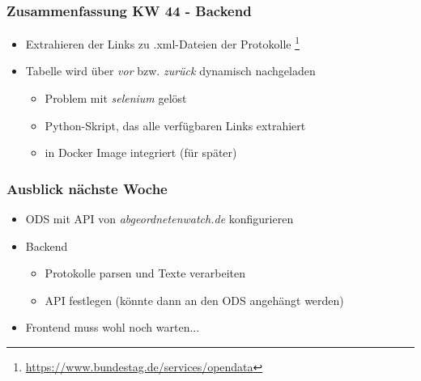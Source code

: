 \documentclass{beamer}
\newcommand{\cw}{44}
\begin{document}
  \begin{frame}
    \frametitle{Zusammenfassung KW \cw{} - Backend}
    \begin{itemize}
      \item Extrahieren der Links zu .xml-Dateien der Protokolle
        \footnote{\url{https://www.bundestag.de/services/opendata}}
      \item Tabelle wird über \textit{vor} bzw. \textit{zurück} dynamisch
        nachgeladen
        \begin{itemize}
          \item Problem mit \textit{selenium} gelöst
          \item Python-Skript, das alle verfügbaren Links extrahiert
          \item in Docker Image integriert (für später)
        \end{itemize}
      \end{itemize}
  \end{frame}

  \begin{frame}
    \frametitle{Ausblick nächste Woche}
      \begin{itemize}
        \item ODS mit API von \textit{abgeordnetenwatch.de} konfigurieren
        \item Backend 
          \begin{itemize}
            \item Protokolle parsen und Texte verarbeiten
            \item API festlegen (könnte dann an den ODS angehängt werden)
          \end{itemize}
        \item Frontend muss wohl noch warten...
      \end{itemize}
  \end{frame}
\end{document}
